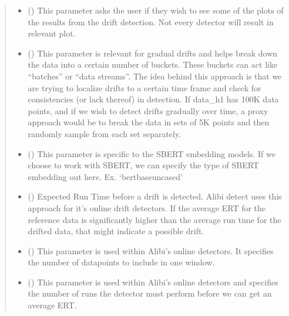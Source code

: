 \documentclass[letterpaper,10pt,english]{sphinxmanual}
\begin{document}
\begin{fulllineitems}
\begin{fulllineitems}
\begin{quote}
\begin{description}
\begin{itemize}
\item {} 
\sphinxAtStartPar
{} () \textendash{} This parameter asks the user if they wish to see some of the plots of the results
from the drift detection. Not every detector will result in relevant plot.

\item {} 
\sphinxAtStartPar
{} () \textendash{} This parameter is relevant for gradual drifts and helps break down the data into a
certain number of buckets. These buckets can act like “batches” or “data streams”.
The idea behind this approach is that we are trying to localize drifts to a certain
time frame and check for consistencies (or lack thereof) in detection.
If data\_h1 has 100K data points, and if we wish to detect drifts
gradually over time, a proxy approach would be to break the data in sets of 5K points
and then randomly sample from each set separately.

\item {} 
\sphinxAtStartPar
{} () \textendash{} This parameter is specific to the SBERT embedding models. If we choose to work with SBERT,
we can specify the type of SBERT embedding out here. Ex. ‘bert\sphinxhyphen{}base\sphinxhyphen{}uncased’

\item {} 
\sphinxAtStartPar
{} (\sphinxstyleliteralemphasis{\sphinxupquote{ (}}\sphinxstyleliteralemphasis{\sphinxupquote{)}}) \textendash{} Expected Run Time before a drift is detected. Alibi detect uses this approach for it’s
online drift detectors. If the average ERT for the reference data is significantly higher
than the average run time for the drifted data, that might indicate a possible drift.

\item {} 
\sphinxAtStartPar
{} () \textendash{} This parameter is used within Alibi’s online detectors.
It specifies the number of datapoints to include in one window.

\item {} 
\sphinxAtStartPar
{} () \textendash{} This parameter is used within Alibi’s online detectors and specifies the number of runs
the detector must perform before we can get an average ERT.


\end{itemize}
\end{description}
\end{quote}
\end{fulllineitems}
\end{fulllineitems}
\end{document}
